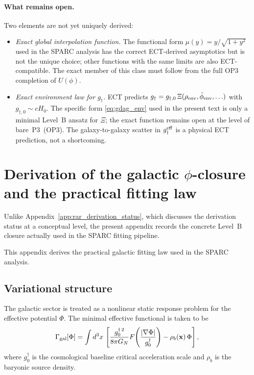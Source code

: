 \documentclass[11pt,a4paper]{article}
\numberwithin{equation}{section}
\begin{document}
\paragraph{What remains open.}
Two elements are not yet uniquely derived:
\begin{itemize}
\item \emph{Exact global interpolation function.}
  The functional form $\mu(y)=y/\sqrt{1+y^2}$ used in the SPARC
  analysis has the correct ECT-derived asymptotics but is not the
  unique choice; other functions with the same limits are also
  ECT-compatible.  The exact member of this class must follow from
  the full OP3 completion of $U(\phi)$.
\item \emph{Exact environment law for $g_\dagger$.}
  ECT predicts
  $g_\dagger=g_{\dagger,0}\,\Xi(\rho_{\rm env},\bar\phi_{\rm env},\ldots)$
  with $g_{\dagger,0}\sim cH_0$.  The specific form
  \eqref{eq:gdag_env} used in the present text is only a minimal
  Level~B ansatz for $\Xi$; the exact function remains open
  at the level of bare~P3~(OP3).
  The galaxy-to-galaxy scatter in $g_\dagger^{\rm eff}$ is a physical
  ECT prediction, not a shortcoming.
\end{itemize}

\section{Derivation of the galactic $\phi$-closure and the practical fitting law}
\label{app:galactic_phi_closure}

Unlike Appendix~\ref{app:rar_derivation_status}, which discusses the
derivation status at a conceptual level, the present appendix records
the concrete Level~B closure actually used in the SPARC fitting
pipeline.

This appendix derives the practical galactic fitting law used in the
SPARC analysis.

\subsection{Variational structure}

The galactic sector is treated as a nonlinear static response problem
for the effective potential $\Phi$.  The minimal effective functional is
taken to be
\begin{equation}
\Gamma_{\rm gal}[\Phi]
=
\int d^3x\,
\left[
\frac{g_0^{\dagger\,2}}{8\pi G_N}
F\!\left(\frac{|\nabla\Phi|}{g^\dagger_0}\right)
-\rho_b(\mathbf{x})\,\Phi
\right],
\label{eq:app_gal_functional}
\end{equation}
where $g^\dagger_0$ is the cosmological baseline critical acceleration
scale and $\rho_b$ is the baryonic source density.
\end{document}
